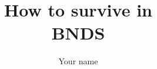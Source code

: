 \documentclass[12pt]{report}
\begin{document}
\title{How to survive in\\
            BNDS}

\author{Your name}

\beforepreface


\afterpreface


















\end{document}
